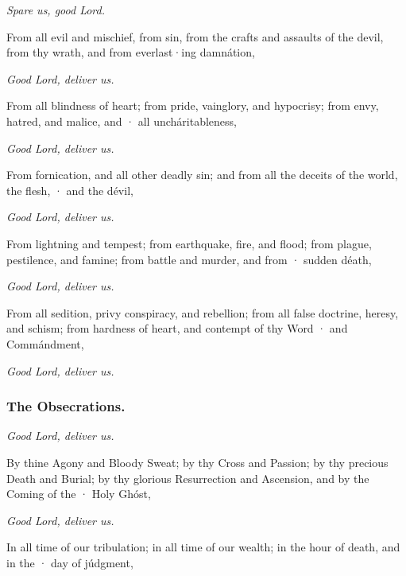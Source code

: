 
\centerline{\emph{Spare us, good Lord.}}

From all evil and mischief, from sin, from the crafts and assaults of the devil, from thy wrath, and from everlast·ing damnátion,

\centerline{\emph{Good Lord, deliver us.}}

From all blindness of heart; from pride, vainglory, and hypocrisy; from envy, hatred, and malice, and · all uncháritableness,

\centerline{\emph{Good Lord, deliver us.}}

From fornication, and all other deadly sin; and from all the deceits of the world, the flesh, · and the dévil,

\centerline{\emph{Good Lord, deliver us.}}

From lightning and tempest; from earthquake, fire, and flood; from plague, pestilence, and famine; from battle and murder, and from · sudden déath,

\centerline{\emph{Good Lord, deliver us.}}

From all sedition, privy conspiracy, and rebellion; from all false doctrine, heresy, and schism; from hardness of heart, and contempt of thy Word · and Commándment,

\centerline{\emph{Good Lord, deliver us.}}



\subsubsection{The Obsecrations.}

\centerline{\emph{Good Lord, deliver us.}}

By thine Agony and Bloody Sweat; by thy Cross and Passion; by thy precious Death and Burial; by thy glorious Resurrection and Ascension, and by the Coming of the · Holy Ghóst,

\centerline{\emph{Good Lord, deliver us.}}

In all time of our tribulation; in all time of our wealth; in the hour of death, and in the · day of júdgment,

